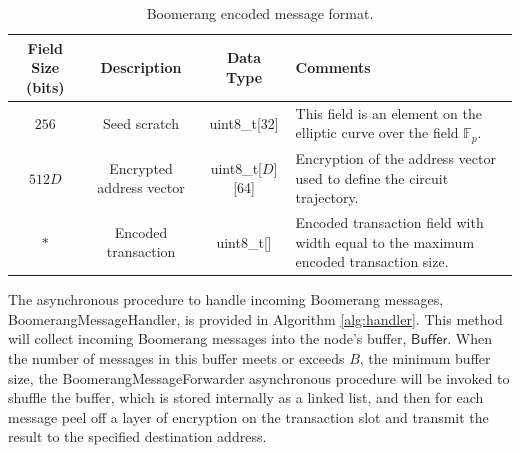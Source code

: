 \begin{table}
\begin{center}
\caption{Boomerang encoded message format.}
\label{tab:msg-header}
    \begin{tabular}{|c|c|c|l|} \hline
    \textbf{Field Size (bits)} & {\bf Description} & {\bf Data Type} & {\bf Comments} \\ \hline
    $256$ & Seed scratch & uint8\_t[32] & This field is an element on the elliptic curve over the field $\mathbb{F}_p$. \\
    $512D$ & Encrypted address vector & uint8\_t[$D$][64] & Encryption of the address vector used to define the circuit trajectory. \\
    $*$ & Encoded transaction & uint8\_t[] & Encoded transaction field with width equal to the maximum encoded transaction size. \\ \hline
    \end{tabular}
\end{center}
\end{table}

The asynchronous procedure to handle incoming Boomerang messages, {\sf BoomerangMessageHandler}, is provided in Algorithm \ref{alg:handler}. This method will collect incoming Boomerang messages into the node's buffer, $\mathsf{Buffer}$. When the number of messages in this buffer meets or exceeds $B$, the minimum buffer size, the {\sf BoomerangMessageForwarder} asynchronous procedure will be invoked to shuffle the buffer, which is stored internally as a linked list, and then for each message peel off a layer of encryption on the transaction slot and transmit the result to the specified destination address.

